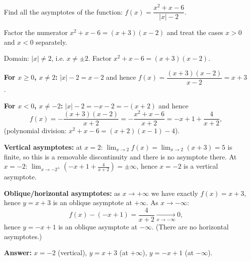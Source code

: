 
\begin{question}
Find all the asymptotes of the function: $f(x)=\dfrac{x^2+x-6}{|x|-2}$.
\end{question}

\begin{hint}
Factor the numerator $x^2+x-6=(x+3)(x-2)$ and treat the cases $x>0$ and $x<0$ separately.
\end{hint}

\begin{solution}
Domain: $|x|\neq2$, i.e. $x\neq\pm2$. Factor $x^2+x-6=(x+3)(x-2)$.

\textbf{For $x\ge0$, $x\ne 2$:} $|x|-2=x-2$ and hence $f(x)=\dfrac{(x+3)(x-2)}{x-2}=x+3$.

\textbf{For $x<0$, $x\ne-2$:} $|x|-2=-x-2=-(x+2)$ and hence
\[ f(x)=-\frac{(x+3)(x-2)}{x+2}=-\frac{x^2+x-6}{x+2}=-x+1+\frac{4}{x+2}, \]
(polynomial division: $x^2+x-6=(x+2)(x-1)-4$).

\textbf{Vertical asymptotes:} at $x=2$: $\lim_{x\to2}f(x)=\lim_{x\to2}(x+3)=5$ is finite, so this is a removable discontinuity and there is no asymptote there. At $x=-2$: $\lim_{x\to-2^\pm}\left(-x+1+\frac{4}{x+2}\right)=\pm\infty$, hence $x=-2$ is a vertical asymptote.

\textbf{Oblique/horizontal asymptotes:} as $x\to+\infty$ we have exactly $f(x)=x+3$, hence $y=x+3$ is an oblique asymptote at $+\infty$. As $x\to-\infty$:
\[ f(x)-(-x+1)=\frac{4}{x+2}\xrightarrow[x\to-\infty]{}0, \]
hence $y=-x+1$ is an oblique asymptote at $-\infty$. (There are no horizontal asymptotes.)

\textbf{Answer:} $x=-2$ (vertical), $y=x+3$ (at $+\infty$), $y=-x+1$ (at $-\infty$).
\end{solution}
